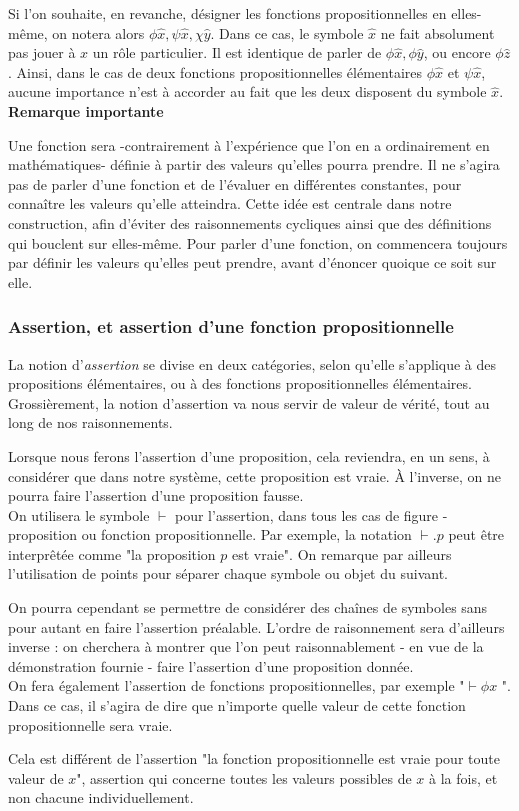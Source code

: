 \documentclass{article}
\begin{document}
Si l'on souhaite, en revanche, désigner les fonctions propositionnelles en elles-même, on notera alors $\phi  \hat{x}, \psi \hat{x}, \chi \hat{y}$. Dans ce cas, le symbole $\hat{x}$ ne fait absolument pas jouer à $x$ un rôle particulier. 
Il est identique de parler de $\phi \hat{x}, \phi \hat{y}$, ou encore $\phi \hat{z}$. Ainsi, dans le cas de deux fonctions propositionnelles élémentaires $\phi\hat{x}$ et $\psi \hat{x}$, aucune importance n'est à accorder au fait que les deux disposent du symbole $\hat{x}$. 
\\

\textbf{Remarque importante}

Une fonction sera -contrairement à l'expérience que l'on en a ordinairement en mathématiques- définie à partir des valeurs qu'elles pourra prendre. Il ne s'agira pas de parler d'une fonction et de l'évaluer en différentes constantes, pour connaître les valeurs qu'elle atteindra. Cette idée est centrale dans notre construction, afin d'éviter des raisonnements cycliques ainsi que des définitions qui bouclent sur elles-même. Pour parler d'une fonction, on commencera toujours par définir les valeurs qu'elles peut prendre, avant d'énoncer quoique ce soit sur elle.

\subsubsection{Assertion, et assertion d'une fonction propositionnelle}

La notion d'\textit{assertion} se divise en deux catégories, selon qu'elle s'applique à des propositions élémentaires, ou à des fonctions propositionnelles élémentaires. Grossièrement, la notion d'assertion va nous servir de valeur de vérité, tout au long de nos raisonnements. 

Lorsque nous ferons l'assertion d'une proposition, cela reviendra, en un sens, à considérer que dans notre système, cette proposition est vraie. À l'inverse, on ne pourra faire l'assertion d'une proposition fausse.
\\

On utilisera le symbole $\vdash$ pour l'assertion, dans tous les cas de figure -proposition ou fonction propositionnelle. Par exemple, la notation $\vdash.p$ peut être interprêtée comme "la proposition $p$ est vraie". On remarque par ailleurs l'utilisation de points pour séparer chaque symbole ou objet du suivant.

On pourra cependant se permettre de considérer des chaînes de symboles sans pour autant en faire l'assertion préalable. L'ordre de raisonnement sera d'ailleurs inverse : on cherchera à montrer que l'on peut raisonnablement - en vue de la démonstration fournie - faire l'assertion d'une proposition donnée.
\\

On fera également l'assertion de fonctions propositionnelles, par exemple "$\vdash \phi x$ ". Dans ce cas, il s'agira de dire que n'importe quelle valeur de cette fonction propositionnelle sera vraie. 

Cela est différent de l'assertion "la fonction propositionnelle est vraie pour toute valeur de $x$", assertion qui concerne toutes les valeurs possibles de $x$ à la fois, et non chacune individuellement.
\end{document}
